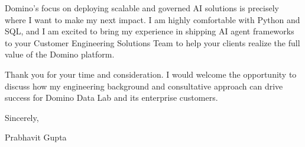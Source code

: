 \documentclass[11pt,a4paper]{article}
\begin{document}
Domino's focus on deploying scalable and governed AI solutions is precisely where I want to make my next impact. I am highly comfortable with Python and SQL, and I am excited to bring my experience in shipping AI agent frameworks to your Customer Engineering Solutions Team to help your clients realize the full value of the Domino platform.

Thank you for your time and consideration. I would welcome the opportunity to discuss how my engineering background and consultative approach can drive success for Domino Data Lab and its enterprise customers.

\vspace{1em}
\noindent Sincerely,

\vspace{1em}
\noindent Prabhavit Gupta
\end{document}
